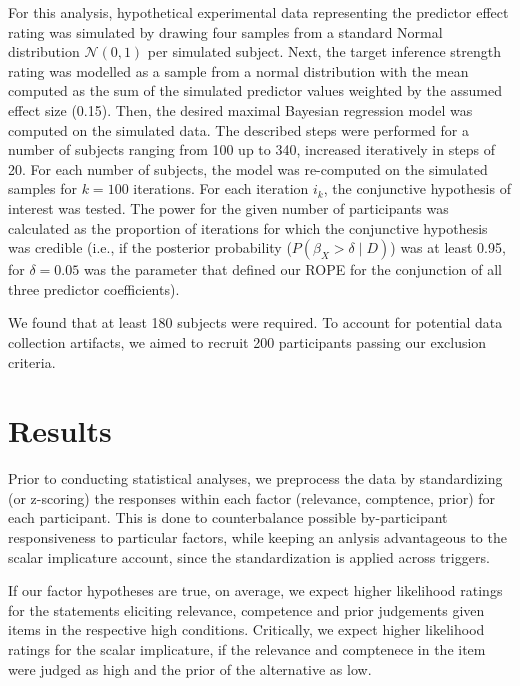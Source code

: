 \documentclass{sp}
\begin{document}
For this analysis, hypothetical experimental data representing the predictor effect rating was simulated by drawing four samples from a standard Normal distribution $\mathcal{N}(0,1)$ per simulated subject. Next, the target inference strength rating was modelled as a sample from a normal distribution with the mean computed as the sum of the simulated predictor values weighted by the assumed effect size (0.15). Then, the desired maximal Bayesian regression model was computed on the simulated data. The described steps were performed for a number of subjects ranging from 100 up to 340, increased iteratively in steps of 20. For each number of subjects, the model was re-computed on the simulated samples for $k=100$ iterations. For each iteration $i_k$, the conjunctive hypothesis of interest was tested. 
The power for the given number of participants was calculated as the proportion of iterations for which the conjunctive hypothesis was credible (i.e., if the posterior probability ($P(\beta_X > \delta \mid D)$) was at least 0.95, for $\delta = 0.05$ was the parameter that defined our ROPE for the conjunction of all three predictor coefficients).

We found that at least 180 subjects were required. To account for potential data collection artifacts, we aimed to recruit 200 participants passing our exclusion criteria.

\section{Results}
Prior to conducting statistical analyses, we preprocess the data by standardizing (or z-scoring) the responses within each factor (relevance, comptence, prior) for each participant. This is done to counterbalance possible by-participant responsiveness to particular factors, while keeping an anlysis advantageous to the scalar implicature account, since the standardization is applied across triggers. 

If our factor hypotheses are true, on average, we expect higher likelihood ratings for the statements eliciting relevance, competence and prior judgements given items in the respective high conditions. Critically, we expect higher likelihood ratings for the scalar implicature, if the relevance and comptenece in the item were judged as high and the prior of the alternative as low.
\end{document}
